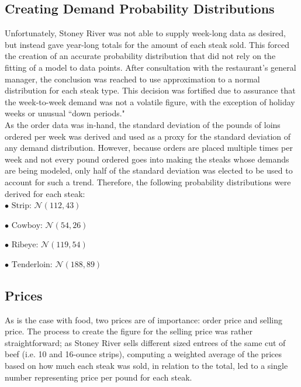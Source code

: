 \documentclass[12pt,a4paper]{article}
\begin{document}
\subsection{Creating Demand Probability Distributions}

Unfortunately, Stoney River was not able to supply week-long data as desired, but instead gave year-long totals for the amount of each steak sold. This forced the creation of an accurate probability distribution that did not rely on the fitting of a model to data points. After consultation with the restaurant's general manager, the conclusion was reached to use approximation to a normal distribution for each steak type. This decision was fortified due to assurance that the week-to-week demand was not a volatile figure, with the exception of holiday weeks or unusual ``down periods." 
\\

As the order data was in-hand, the standard deviation of the pounds of loins ordered per week was derived and used as a proxy for the standard deviation of any demand distribution. However, because orders are placed multiple times per week and not every pound ordered goes into making the steaks whose demands are being modeled, only half of the standard deviation was elected to be used to account for such a trend. Therefore, the following probability distributions were derived for each steak:
\\

$ \bullet \text{ Strip: } \mathcal{N}(112, 43)  $

$ \bullet \text{ Cowboy: } \mathcal{N}(54, 26)  $

$ \bullet \text{ Ribeye: } \mathcal{N}(119, 54)  $

$ \bullet \text{ Tenderloin: } \mathcal{N}(188, 89)  $
\\

\subsection{Prices}

As is the case with food, two prices are of importance: order price and selling price. The process to create the figure for the selling price was rather straightforward; as Stoney River sells different sized entrees of the same cut of beef (i.e. 10 and 16-ounce strips), computing a weighted average of the prices based on how much each steak was sold, in relation to the total, led to a single number representing price per pound for each steak. 
\\
\end{document}
